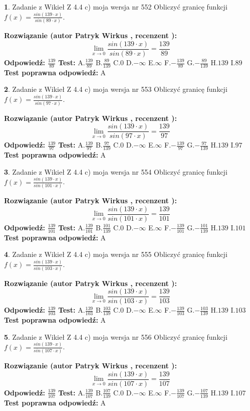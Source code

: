 \documentclass[12pt, a4paper]{article}
\theoremstyle{definition} %
\newtheorem{zad}{}
\newcommand{\zadStart}[1]{\begin{zad}#1\newline}
\newcommand{\zadStop}{\end{zad}}
\newcommand{\rozwStart}[2]{\noindent \textbf{Rozwiązanie (autor #1 , recenzent #2): }\newline}
\newcommand{\rozwStop}{\newline}
\newcommand{\odpStart}{\noindent \textbf{Odpowiedź:}\newline}
\newcommand{\odpStop}{\newline}
\newcommand{\testStart}{\noindent \textbf{Test:}\newline}
\newcommand{\testStop}{\newline}
\newcommand{\kluczStart}{\noindent \textbf{Test poprawna odpowiedź:}\newline}
\newcommand{\kluczStop}{\newline}
\begin{document}
\zadStart{Zadanie z Wikieł Z 4.4 c) moja wersja nr 552}
Obliczyć granicę funkcji $f(x)=\frac{sin(139\cdot x)}{sin(89\cdot x)}$.
\zadStop
\rozwStart{Patryk Wirkus}{}
$$\lim\limits_{x\to 0}\frac{sin(139\cdot x)}{sin(89\cdot x)}=
\frac{139}{89}$$
\rozwStop
\odpStart
$\frac{139}{89}$
\odpStop
\testStart
A.$\frac{139}{89}$
B.$\frac{89}{139}$
C.$0$
D.$-\infty$
E.$\infty$
F.$-\frac{139}{89}$
G.$-\frac{89}{139}$
H.$139$
I.$89$
\testStop
\kluczStart
A
\kluczStop



\zadStart{Zadanie z Wikieł Z 4.4 c) moja wersja nr 553}
Obliczyć granicę funkcji $f(x)=\frac{sin(139\cdot x)}{sin(97\cdot x)}$.
\zadStop
\rozwStart{Patryk Wirkus}{}
$$\lim\limits_{x\to 0}\frac{sin(139\cdot x)}{sin(97\cdot x)}=
\frac{139}{97}$$
\rozwStop
\odpStart
$\frac{139}{97}$
\odpStop
\testStart
A.$\frac{139}{97}$
B.$\frac{97}{139}$
C.$0$
D.$-\infty$
E.$\infty$
F.$-\frac{139}{97}$
G.$-\frac{97}{139}$
H.$139$
I.$97$
\testStop
\kluczStart
A
\kluczStop



\zadStart{Zadanie z Wikieł Z 4.4 c) moja wersja nr 554}
Obliczyć granicę funkcji $f(x)=\frac{sin(139\cdot x)}{sin(101\cdot x)}$.
\zadStop
\rozwStart{Patryk Wirkus}{}
$$\lim\limits_{x\to 0}\frac{sin(139\cdot x)}{sin(101\cdot x)}=
\frac{139}{101}$$
\rozwStop
\odpStart
$\frac{139}{101}$
\odpStop
\testStart
A.$\frac{139}{101}$
B.$\frac{101}{139}$
C.$0$
D.$-\infty$
E.$\infty$
F.$-\frac{139}{101}$
G.$-\frac{101}{139}$
H.$139$
I.$101$
\testStop
\kluczStart
A
\kluczStop



\zadStart{Zadanie z Wikieł Z 4.4 c) moja wersja nr 555}
Obliczyć granicę funkcji $f(x)=\frac{sin(139\cdot x)}{sin(103\cdot x)}$.
\zadStop
\rozwStart{Patryk Wirkus}{}
$$\lim\limits_{x\to 0}\frac{sin(139\cdot x)}{sin(103\cdot x)}=
\frac{139}{103}$$
\rozwStop
\odpStart
$\frac{139}{103}$
\odpStop
\testStart
A.$\frac{139}{103}$
B.$\frac{103}{139}$
C.$0$
D.$-\infty$
E.$\infty$
F.$-\frac{139}{103}$
G.$-\frac{103}{139}$
H.$139$
I.$103$
\testStop
\kluczStart
A
\kluczStop



\zadStart{Zadanie z Wikieł Z 4.4 c) moja wersja nr 556}
Obliczyć granicę funkcji $f(x)=\frac{sin(139\cdot x)}{sin(107\cdot x)}$.
\zadStop
\rozwStart{Patryk Wirkus}{}
$$\lim\limits_{x\to 0}\frac{sin(139\cdot x)}{sin(107\cdot x)}=
\frac{139}{107}$$
\rozwStop
\odpStart
$\frac{139}{107}$
\odpStop
\testStart
A.$\frac{139}{107}$
B.$\frac{107}{139}$
C.$0$
D.$-\infty$
E.$\infty$
F.$-\frac{139}{107}$
G.$-\frac{107}{139}$
H.$139$
I.$107$
\testStop
\kluczStart
A
\kluczStop
\end{document}
